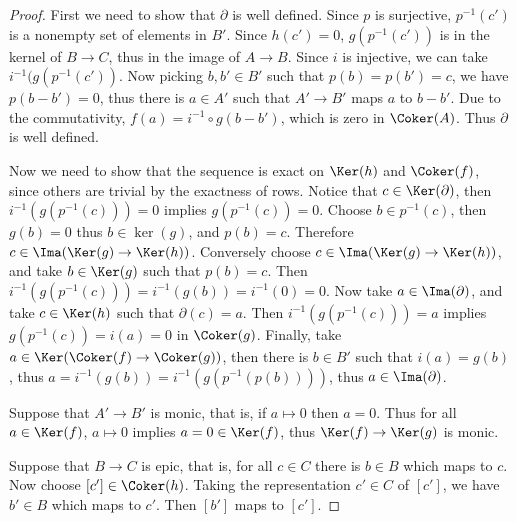 \begin{proof}
First we need to show that $\partial$ is well defined. Since $p$ is surjective, $p^{-1}(c')$ is a nonempty set of elements in $B'$. Since $h(c')=0$, $g(p^{-1}(c'))$ is in the kernel of $B\rightarrow C$, thus in the image of $A\rightarrow B$. Since $i$ is injective, we can take $i^{-1}(g(p^{-1}(c'))$. Now picking $b,b'\in B'$ such that $p(b)=p(b')=c$, we have $p(b-b')=0$, thus there is $a\in A'$ such that $A'\rightarrow B'$ maps $a$ to $b-b'$. Due to the commutativity, $f(a)=i^{-1}\circ g(b-b')$, which is zero in $\Coker(A)$. Thus $\partial$ is well defined.

Now we need to show that the sequence is exact on $\Ker(h)$ and $\Coker(f)$, since others are trivial by the exactness of rows. Notice that $c\in \Ker(\partial)$, then $i^{-1}(g(p^{-1}(c)))=0$ implies $g(p^{-1}(c))=0$. Choose $b\in p^{-1}(c)$, then $g(b)=0$ thus $b\in \ker(g)$, and $p(b)=c$. Therefore $c\in \Ima(\Ker(g)\rightarrow \Ker(h))$. Conversely choose $c\in \Ima(\Ker(g)\rightarrow \Ker(h))$, and take $b\in\Ker(g)$ such that $p(b)=c$. Then $i^{-1}(g(p^{-1}(c)))=i^{-1}(g(b))=i^{-1}(0)=0$. Now take $a\in \Ima(\partial)$, and take $c\in \Ker(h)$ such that $\partial(c)=a$. Then $i^{-1}(g(p^{-1}(c)))=a$ implies $g(p^{-1}(c))=i(a)=0$ in $\Coker(g)$. Finally, take $a\in \Ker(\Coker(f)\rightarrow \Coker(g))$, then there is $b\in B'$ such that $i(a)=g(b)$, thus $a=i^{-1}(g(b))=i^{-1}(g(p^{-1}(p(b))))$, thus $a\in \Ima(\partial)$.

Suppose that $A'\rightarrow B'$ is monic, that is, if $a\mapsto 0$ then $a=0$. Thus for all $a\in \Ker(f)$, $a\mapsto 0$ implies $a=0\in \Ker(f)$, thus $\Ker(f)\rightarrow \Ker(g)$ is monic.

Suppose that $B\rightarrow C$ is epic, that is, for all $c\in C$ there is $b\in B$ which maps to $c$. Now choose $[c']\in \Coker(h)$. Taking the representation $c'\in C$ of $[c']$, we have $b'\in B$ which maps to $c'$. Then $[b']$ maps to $[c']$.
\end{proof}

